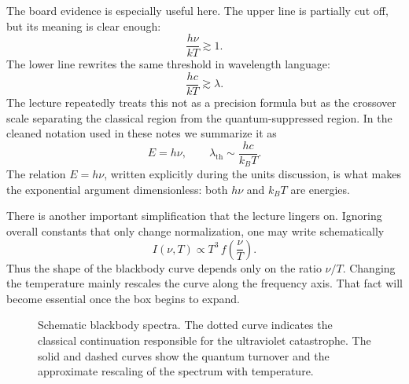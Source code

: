 The board evidence is especially useful here. The upper line is partially cut off, but its meaning is clear enough:
\begin{equation}
\frac{h\nu}{kT}\gtrsim 1.
\end{equation}
The lower line rewrites the same threshold in wavelength language:
\begin{equation}
\frac{hc}{kT}\gtrsim \lambda.
\end{equation}
The lecture repeatedly treats this not as a precision formula but as the crossover scale separating the classical region from the quantum-suppressed region. In the cleaned notation used in these notes we summarize it as
\begin{equation}
E = h\nu,
\qquad
\lambda_{\mathrm{th}} \sim \frac{hc}{k_B T}.
\end{equation}
The relation \(E=h\nu\), written explicitly during the units discussion, is what makes the exponential argument dimensionless: both \(h\nu\) and \(k_B T\) are energies.

There is another important simplification that the lecture lingers on. Ignoring overall constants that only change normalization, one may write schematically
\begin{equation}
I(\nu,T) \propto T^3\, f\!\left(\frac{\nu}{T}\right).
\end{equation}
Thus the shape of the blackbody curve depends only on the ratio \(\nu/T\). Changing the temperature mainly rescales the curve along the frequency axis. That fact will become essential once the box begins to expand.

\begin{figure}[t]
\centering
{}
\caption{Schematic blackbody spectra. The dotted curve indicates the classical continuation responsible for the ultraviolet catastrophe. The solid and dashed curves show the quantum turnover and the approximate rescaling of the spectrum with temperature.}
\end{figure}

